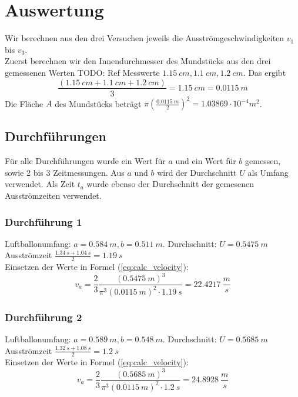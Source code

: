 \documentclass{article}
\begin{document}
    \section{Auswertung}
    Wir berechnen aus den drei Versuchen jeweils die Ausströmgeschwindigkeiten \(v_1\) bis \(v_3\). \\
    Zuerst berechnen wir den Innendurchmesser des Mundstücks aus den drei gemessenen Werten TODO: Ref Messwerte
    \(\SI{1.15}{cm}, \SI{1.1}{cm}, \SI{1.2}{cm} \). Das ergibt
    \begin{equation}
        \frac{ (\SI{1.15}{cm} + \SI{1.1}{cm} + \SI{1.2}{cm}) }{3} = \SI{1.15}{cm} = \SI{0.0115}{m}
    \end{equation}
    Die Fläche \(A\) des Mundstücks beträgt \( \pi {\left( \frac{ \SI{0.0115}{m} }{2} \right)}^2 = 1.03869 \cdot 10^{-4} \si{m^2} \).

    \subsection{Durchführungen}
    Für alle Durchführungen wurde ein Wert für \(a\) und ein Wert für \(b\) gemessen, sowie 2 bis 3 Zeitmessungen.
    Aus \(a\) und \(b\) wird der Durchschnitt \(U\) als Umfang verwendet.
    Als Zeit \(t_a\) wurde ebenso der Durchschnitt der gemesenen Ausströmzeiten verwendet.

    \subsubsection{Durchführung 1}
        Luftballonumfang: \(a = \SI{0.584}{m}, b = \SI{0.511}{m} \). Durchschnitt: \(U = \SI{0.5475}{m}\) \\
        Ausströmzeit \( \frac{\SI{1.34}{s} + \SI{1.04}{s} }{2} = \SI{1.19}{s} \) \\
        Einsetzen der Werte in Formel (\ref{eq:calc_velocity}):
        \[ v_a = \frac{2}{3} \frac{{( \SI{0.5475}{m} )}^3}{\pi^3 {( \SI{0.0115}{m} )}^2 \cdot \SI{1.19}{s} } = \SI{22.4217}{\frac{m}{s}} \]

    \subsubsection{Durchführung 2}
        Luftballonumfang: \(a = \SI{0.589}{m}, b = \SI{0.548}{m} \). Durchschnitt: \(U = \SI{0.5685}{m} \) \\
        Ausströmzeit \( \frac{\SI{1.32}{s} + \SI{1.08}{s} }{2} = \SI{1.2}{s} \) \\
        Einsetzen der Werte in Formel (\ref{eq:calc_velocity}):
        \[ v_a = \frac{2}{3} \frac{{( \SI{0.5685}{m} )}^3}{\pi^3 {( \SI{0.0115}{m} )}^2 \cdot \SI{1.2}{s} } = \SI{24.8928}{\frac{m}{s}} \]
\end{document}
